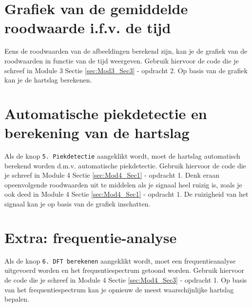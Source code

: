 \section{Grafiek van de gemiddelde roodwaarde i.f.v. de tijd}
\label{sec:Mod5_Sec4}
%
Eens de roodwaarden van de afbeeldingen berekend zijn, kan je de grafiek van de roodwaarden in functie van de tijd weergeven. Gebruik hiervoor de code die je schreef in Module 3 Sectie \ref{sec:Mod3_Sec3} - opdracht 2. Op basis van de grafiek kan je de hartslag berekenen.

\section{Automatische piekdetectie en berekening van de hartslag}
\label{sec:Mod5_Sec5}
%
Als de knop \texttt{5. Piekdetectie} aangeklikt wordt, moet de hartslag automatisch berekend worden d.m.v. automatische piekdetectie. Gebruik hiervoor de code die je schreef in Module 4 Sectie \ref{sec:Mod4_Sec1} - opdracht 1. Denk eraan opeenvolgende roodwaarden uit te middelen als je signaal heel ruizig is, zoals je ook deed in Module 4 Sectie \ref{sec:Mod4_Sec1} - opdracht 1. De ruizigheid van het signaal kan je op basis van de grafiek inschatten.

\section{Extra: frequentie-analyse}
\label{sec:Mod5_Sec6}
%  
Als de knop \texttt{6. DFT berekenen} aangeklikt wordt, moet een frequentieanalyse uitgevoerd worden en het frequentiespectrum getoond worden. Gebruik hiervoor de code die je schreef in Module 4 Sectie \ref{sec:Mod4_Sec3} - opdracht 1. Op basis van het frequentiespectrum kan je opnieuw de meest waarschijnlijke hartslag bepalen.


